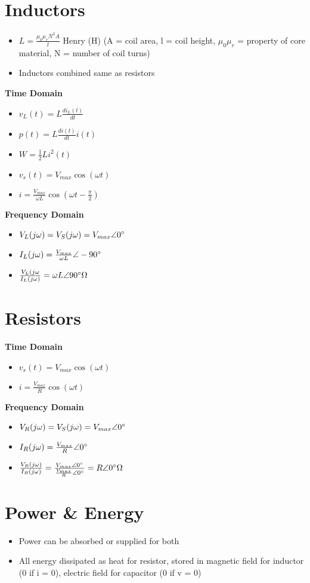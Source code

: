 \documentclass [12pt] {article}
\begin{document}
\begin{multicols*}{2}
\section{Inductors}
	\begin{itemize}
		\item $L = \frac{\mu_0\mu_rN^2A}{l}$ Henry (H) (A = coil area, l = coil height, $\mu_0\mu_r$ = property of core material, N = number of coil turns) 
		\item Inductors combined same as resistors 
	\end{itemize}
\textbf{Time Domain} 
	\begin{itemize}
		\item $v_L(t) = L\frac{di_L(t)}{dt}$
		\item $p(t) = L\frac{di(t)}{dt}i(t)$
		\item $ W = \frac{1}{2}Li^2(t) $ 
		\item $v_s(t) = V_{max}\cos(\omega t) $
		\item $i = \frac{V_{max}}{\omega L}\cos(\omega t - \frac{\pi}{2}) $
	\end{itemize}
\textbf{Frequency Domain}
	\begin{itemize}
		\item $V_L(j\omega)  = V_S(j\omega) = V_{max}\angle 0\degree$
		\item $I_L(j\omega) = \frac{V_{max}}{\omega L}\angle -90 \degree$
		\item $\frac{V_L(j\omega}{I_L(j\omega)} = \omega L \angle 90 \degree \Omega $
	\end{itemize}
\section{Resistors}
\textbf{Time Domain} 
	\begin{itemize}
		\item $v_s(t) = V_{max}\cos(\omega t)$
		\item $i = \frac{V_{max}}{R}\cos(\omega t)$
	\end{itemize}
\textbf{Frequency Domain} 
	\begin{itemize}
		\item $V_R(j\omega) = V_S(j\omega) = V_{max}\angle0\degree $
		\item $I_R(j\omega) = \frac{V_{max}}{R}\angle 0\degree$ 
		\item $\frac{V_R(j\omega)}{I_R(j\omega)} = \frac{V_{max}\angle 0\degree}{\frac{V_{max}}{R}\angle 0\degree} = R\angle 0 \degree \Omega $
	\end{itemize}
\section{Power \& Energy}
	\begin{itemize}
		\item Power can be absorbed or supplied for both
		\item All energy dissipated as heat for resistor, stored in magnetic field for inductor (0 if i = 0), electric field for capacitor (0 if v = 0)
	\end{itemize}

\end{multicols*}
\end{document}
